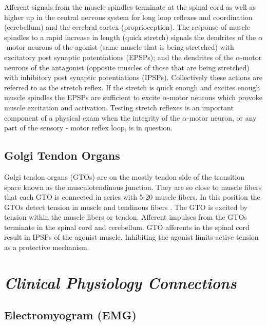 Afferent signals from the muscle spindles terminate at the spinal cord as well as higher up in the central nervous system for long loop reflexes and coordination (cerebellum) and the cerebral cortex (proprioception). The response of muscle spindles to a rapid increase in length (quick stretch) signals the dendrites of the $\alpha$-motor neurons of the agonist (same muscle that is being stretched) with excitatory post synaptic potentiations (EPSPs); and the dendrites of the $\alpha$-motor neurons of the antagonist (opposite muscles of those that are being stretched) with inhibitory post synaptic potentiations (IPSPs). Collectively these actions are referred to as the stretch reflex. If the stretch is quick enough and excites enough muscle spindles the EPSPs are sufficient to excite $\alpha$-motor neurons which provoke muscle excitation and activation. Testing stretch reflexes is an important component of a physical exam when the integrity of the $\alpha$-motor neuron, or any part of the sensory - motor reflex loop, is in question.

\subsection{Golgi Tendon Organs}

Golgi tendon organs (GTOs) are on the mostly tendon side of the transition space known as the musculotendinous junction. They are so close to muscle fibers that each GTO is connected in series with 5-20 muscle fibers. In this position the GTOs detect tension in muscle and tendinous fibers \cite{macefield_physiological_2005}. The GTO is excited by tension within the muscle fibers or tendon. Afferent impulses from the GTOs terminate in the spinal cord and cerebellum. GTO afferents in the spinal cord result in IPSPs of the agonist muscle. Inhibiting the agonist limits active tension as a protective mechanism.

\section{\textit{Clinical Physiology Connections}}

\subsection{Electromyogram (EMG)}

